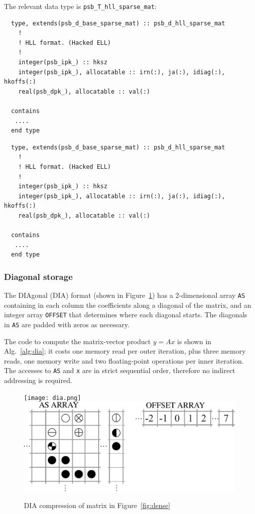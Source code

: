 The relevant data type is \verb|psb_T_hll_sparse_mat|:
\ifpdf
\begin{verbatim}
  type, extends(psb_d_base_sparse_mat) :: psb_d_hll_sparse_mat
    !
    ! HLL format. (Hacked ELL) 
    !     
    integer(psb_ipk_) :: hksz
    integer(psb_ipk_), allocatable :: irn(:), ja(:), idiag(:), hkoffs(:)
    real(psb_dpk_), allocatable :: val(:)

  contains
   ....
  end type
\end{verbatim}
\else
\begin{center}
    \begin{minipage}[tl]{0.9\textwidth}
\begin{verbatim} 
  type, extends(psb_d_base_sparse_mat) :: psb_d_hll_sparse_mat
    !
    ! HLL format. (Hacked ELL) 
    !     
    integer(psb_ipk_) :: hksz
    integer(psb_ipk_), allocatable :: irn(:), ja(:), idiag(:), hkoffs(:)
    real(psb_dpk_), allocatable :: val(:)

  contains
   ....
  end type
\end{verbatim}
    \end{minipage}
  \end{center}
\fi

\subsubsection*{Diagonal storage}


The DIAgonal (DIA) format (shown in Figure~\ref{fig:dia}) 
has   a 2-dimensional array \verb|AS| containing in each column the
coefficients along a  diagonal of the matrix, and an integer array
\verb|OFFSET|  that determines  where each diagonal starts. The
diagonals in \verb|AS| are padded with zeros as necessary. 

The code to compute the matrix-vector product $y=Ax$ is shown in Alg.~\ref{alg:dia};
it costs one  memory read per outer iteration, 
plus three memory reads, one memory write  and two floating-point
operations per inner iteration. The accesses to  \verb|AS| and
\verb|x| are in strict sequential order,  therefore no indirect
addressing is required.  

\begin{figure}[ht]
	\centering
\ifcase\pdfoutput
  \texttt{[image: dia.png]}
\or
  \includegraphics[width=.72\textwidth]{figures/dia.pdf}
\fi
	\caption{DIA compression of matrix in Figure~\ref{fig:dense}}
	\label{fig:dia}
\end{figure} 



